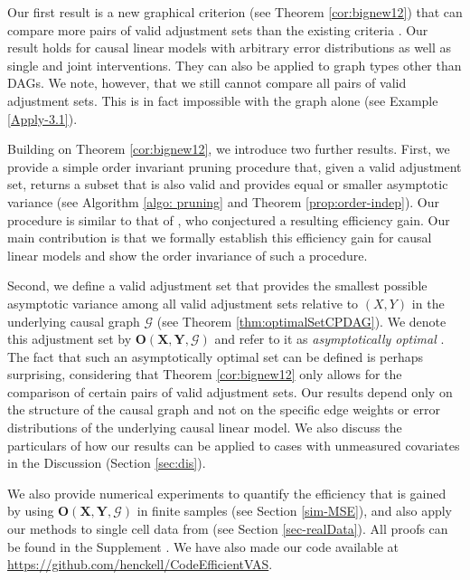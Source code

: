 \documentclass[11pt,a4paper]{article}
\theoremstyle{definition}
\theoremstyle{remark}
\newcommand{\g}[1][G]{\mathcal{#1}}
\newcommand{\optb}[2][X,Y]{\mathbf{O}(\mathbf{#1},#2)}
\begin{document}
Our first result is a new graphical criterion (see Theorem \ref{cor:bignew12}) that can compare more pairs of valid adjustment sets than the existing criteria \citep{kuroki2003covariate,kuroki2004selection}. Our result holds for causal linear models with arbitrary error distributions as well as single and joint interventions. They can also be applied to graph types other than DAGs. We note, however, that we still cannot compare all pairs of valid adjustment sets. This is in fact impossible with the graph alone (see Example \ref{Apply-3.1}).


Building on Theorem \ref{cor:bignew12}, we introduce two further results. First, we provide a simple order invariant pruning procedure that, given a valid adjustment set, returns a subset that is also valid and provides equal or smaller asymptotic variance (see Algorithm \ref{algo: pruning} and Theorem \ref{prop:order-indep}). Our procedure is similar to that of \citet[Propositions 1 and 2]{vanderweele2011new}, who conjectured a resulting efficiency gain. Our main contribution is that we formally establish this efficiency gain for causal linear models and show the order invariance of such a procedure. 

Second, we define a valid adjustment set that provides the smallest possible asymptotic variance among all valid adjustment sets relative to $(X,Y)$ in the underlying causal graph $\g$ (see Theorem \ref{thm:optimalSetCPDAG}). 
We denote this adjustment set by $\optb{\g}$ and refer to it as \textit{ asymptotically optimal} . The fact that such an asymptotically optimal set can be defined is perhaps surprising, considering that Theorem \ref{cor:bignew12} only allows for the comparison of certain pairs of valid adjustment sets. 
Our results depend only on the structure of the causal graph and not on the specific edge weights or error distributions of the underlying causal linear model. 
We also discuss the particulars of how our results can be applied to cases with unmeasured covariates in the Discussion (Section \ref{sec:dis}).

We also provide numerical experiments to quantify the efficiency that is gained by using $\optb{\g}$ in finite samples (see Section \ref{sim-MSE}), and also apply our methods to single cell data from \citet{sachs2005causal} (see Section \ref{sec-realData}). All proofs can be found in the Supplement \citep{supplement}. We have also made our code available at \url{https://github.com/henckell/CodeEfficientVAS}.
\end{document}
